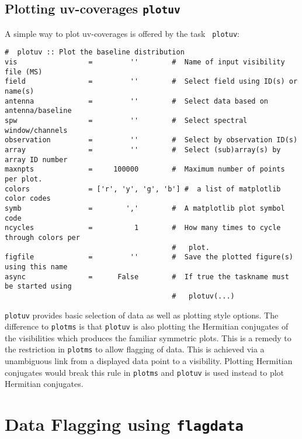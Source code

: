 \subsection{Plotting uv-coverages {\tt plotuv}}
\label{section:edit.plot.plotuv}


A simple way to plot uv-coverages is offered by the task {\tt
  plotuv}:

\small
\begin{verbatim}
#  plotuv :: Plot the baseline distribution
vis                 =         ''        #  Name of input visibility file (MS)
field               =         ''        #  Select field using ID(s) or name(s)
antenna             =         ''        #  Select data based on antenna/baseline
spw                 =         ''        #  Select spectral window/channels
observation         =         ''        #  Select by observation ID(s)
array               =         ''        #  Select (sub)array(s) by array ID number
maxnpts             =     100000        #  Maximum number of points per plot.
colors              = ['r', 'y', 'g', 'b'] #  a list of matplotlib color codes
symb                =        ','        #  A matplotlib plot symbol code
ncycles             =          1        #  How many times to cycle through colors per
                                        #   plot.
figfile             =         ''        #  Save the plotted figure(s) using this name
async               =      False        #  If true the taskname must be started using
                                        #   plotuv(...)
\end{verbatim}
\normalsize

{\tt plotuv} provides basic selection of data as well as plotting
style options. The difference to {\tt plotms} is that {\tt plotuv} is
also plotting the Hermitian conjugates of the visibilities which
produces the familiar symmetric plots. This is a remedy to the
restriction in {\tt plotms} to allow flagging of data. This is
achieved via a unambiguous link from a displayed data point to a
visibility. Plotting Hermitian conjugates would break this rule in
{\tt plotms} and {\tt plotuv} is used instead to plot Hermitian
conjugates.





\section{Data Flagging using {\tt flagdata}}
\label{section:edit.flagdata}

